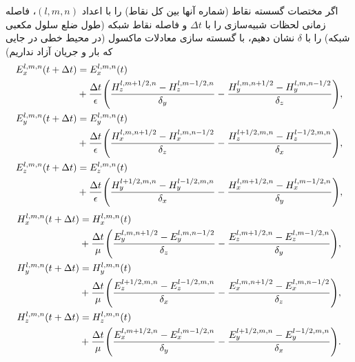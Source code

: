 \documentclass[12pt,a4paper]{article}
\begin{document}
	اگر مختصات گسسته نقاط (شماره آنها بین کل نقاط) را با اعداد $(l, m, n)$،
	فاصله زمانی لحظات شبیه‌سازی را با $\Delta{t}$ و فاصله نقاط شبکه (طول ضلع سلول مکعبی شبکه) را با $\delta$ نشان دهیم،
	با گسسته سازی معادلات ماکسول (در محیط خطی در جایی که بار و جریان آزاد نداریم)
	\begin{align}
		\begin{split}
			E_x^{l,m,n}(t + \Delta{t}) &= E_x^{l,m,n}(t) \\
			&+ \frac{\Delta{t}}{\epsilon}\qty(\frac{H_z^{l,m+1/2,n}-H_z^{l,m-1/2,n}}{\delta_y}-\frac{H_y^{l,m,n+1/2}-H_y^{l,m,n-1/2}}{\delta_z}),
		\end{split}\\
		\begin{split}
			E_y^{l,m,n}(t + \Delta{t}) &= E_y^{l,m,n}(t) \\
			&+ \frac{\Delta{t}}{\epsilon}\qty(\frac{H_x^{l,m,n+1/2}-H_x^{l,m,n-1/2}}{\delta_z}-\frac{H_z^{l+1/2,m,n}-H_z^{l-1/2,m,n}}{\delta_x}),
		\end{split}\\
		\begin{split}
			E_z^{l,m,n}(t + \Delta{t}) &= E_z^{l,m,n}(t) \\
			&+ \frac{\Delta{t}}{\epsilon}\qty(\frac{H_y^{l+1/2,m,n}-H_y^{l-1/2,m,n}}{\delta_x}-\frac{H_x^{l,m+1/2,n}-H_x^{l,m-1/2,n}}{\delta_y}),
		\end{split}
	\end{align}
	\begin{align}
		\begin{split}
			H_x^{l,m,n}(t + \Delta{t}) &= H_x^{l,m,n}(t) \\
			&+ \frac{\Delta{t}}{\mu}\qty(\frac{E_y^{l,m,n+1/2}-E_y^{l,m,n-1/2}}{\delta_z}-\frac{E_z^{l,m+1/2,n}-E_z^{l,m-1/2,n}}{\delta_y}),
		\end{split}\\
		\begin{split}
			H_y^{l,m,n}(t + \Delta{t}) &= H_y^{l,m,n}(t) \\
			&+ \frac{\Delta{t}}{\mu}\qty(\frac{E_z^{l+1/2,m,n}-E_z^{l-1/2,m,n}}{\delta_x}
			-\frac{E_x^{l,m,n+1/2}-E_x^{l,m,n-1/2}}{\delta_z}),
		\end{split}\\
		\begin{split}
			H_z^{l,m,n}(t + \Delta{t}) &= H_z^{l,m,n}(t) \\
			&+ \frac{\Delta{t}}{\mu}\qty(\frac{E_x^{l,m+1/2,n}-E_x^{l,m-1/2,n}}{\delta_y}-\frac{E_y^{l+1/2,m,n}-E_y^{l-1/2,m,n}}{\delta_x}).
		\end{split}
	\end{align}
\end{document}
